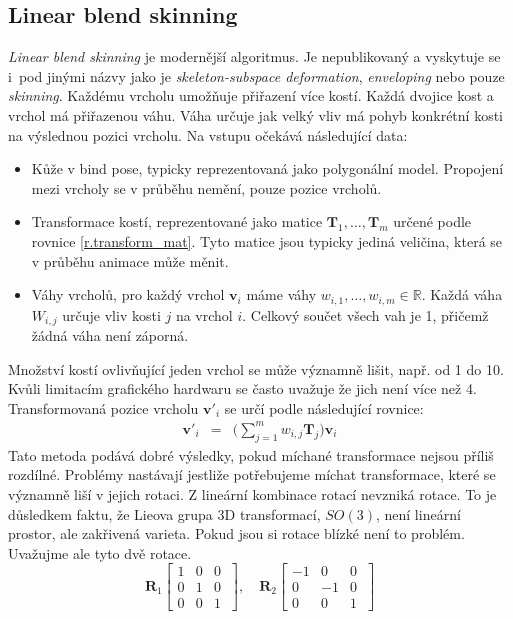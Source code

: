 \subsection{Linear blend skinning} \label{linear_blend_skinning}
\textit{Linear blend skinning} \cite{skinningMethods} je modernější algoritmus. Je nepublikovaný a vyskytuje se i~pod jinými názvy jako je \textit{skeleton-subspace deformation}, \textit{enveloping} nebo pouze \textit{skinning}. Každému vrcholu umožňuje přiřazení více kostí. Každá dvojice kost a vrchol má přiřazenou váhu. Váha určuje jak velký vliv má pohyb konkrétní kosti na výslednou pozici vrcholu. Na vstupu očekává následující data: 
\begin{itemize}
\item Kůže v bind pose, typicky reprezentovaná jako polygonální model. Propojení mezi vrcholy se v průběhu nemění, pouze pozice vrcholů. 
\item Transformace kostí, reprezentované jako matice $\mathbf{T}_1,\ldots,\mathbf{T}_m$ určené podle rovnice \ref{r.transform_mat}. Tyto matice jsou typicky jediná veličina, která se v průběhu animace může měnit. 
\item \label{weight_sum} Váhy vrcholů, pro každý vrchol $\mathbf{v}_i$ máme váhy $w_{i,1},\ldots,w_{i,m} \in \mathbb{R}$. Každá váha $W_{i,j}$ určuje vliv kosti $j$ na vrchol $i$. Celkový součet všech vah je 1, přičemž žádná váha není záporná. 
\end{itemize}
Množství kostí ovlivňující jeden vrchol se může významně lišit, např. od 1 do 10. Kvůli limitacím grafického hardwaru se často uvažuje že jich není více než 4. Transformovaná pozice vrcholu $\mathbf{v}'_i$ se určí podle následující rovnice:
\begin{eqnarray}
\mathbf{v}'_i &=& \Bigg(\sum_{j=1}^mw_{i,j} \mathbf{T}_j\Bigg)\mathbf{v}_i\label{r.linear_blend_skinning}
\end{eqnarray}
 Tato metoda podává dobré výsledky, pokud míchané transformace nejsou příliš rozdílné. Problémy nastávají jestliže potřebujeme míchat transformace, které se významně liší v jejich rotaci. Z lineární kombinace rotací nevzniká rotace. To je důsledkem faktu, že Lieova grupa 3D transformací, $SO(3)$, není lineární prostor, ale zakřivená varieta. Pokud jsou si rotace blízké není to problém. Uvažujme ale tyto dvě rotace.
$$\mathbf{R}_1\left[\begin{array}{ccc}
1 & 0 & 0\\
0 & 1 & 0\\
0 & 0 & 1~\end{array}\right], \quad \mathbf{R}_2 \left[\begin{array}{ccc}
-1 & 0 & 0\\
0 & -1 & 0\\
0 & 0 & 1~\end{array}\right]$$ 

